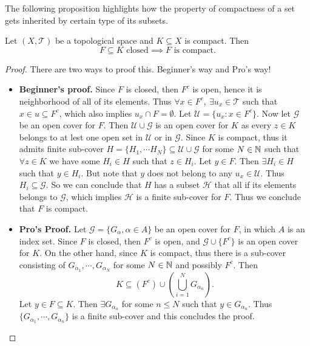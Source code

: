 The following proposition highlights how the property of compactness of a set gets inherited by certain type of its subsets. 

\begin{proposition}
	\label{prop:CloseSubSetOfCompactIsCompact}
	Let $(X,\mathcal{T})$ be a topological space and $K \subseteq X$ is compact. Then
	\[ F \subseteq K \text{ closed} \implies F \text{ is compact}. \]
\end{proposition}

\begin{proof}
	There are two ways to proof this. Beginner's way and Pro's way!
	\begin{itemize}
		\item \textbf{Beginner's proof.} Since $F$ is closed, then $F^c$ is open, hence it is neighborhood of all of its elements. Thus $\forall x \in F^c,\ \exists u_x \in \mathcal{T}$ such that $x \in u \subseteq F^c$, which also implies $u_x \cap F = \emptyset$. Let $\mathcal{U} = \{u_x: x\in F^c\}$. Now let $\mathcal{G}$ be an open cover for $F$. Then $\mathcal{U} \cup \mathcal{G}$ is an open cover for $K$ as every $z \in K$ belongs to at lest one open set in $\mathcal{U}$ or in $\mathcal{G}$. Since $K$ is compact, thus it admits finite sub-cover $H = \{H_1, \cdots H_N\} \subseteq \mathcal{U} \cup \mathcal{G}$ for some $N \in \mathbb{N}$ such that $\forall z \in K$ we have some $H_i \in H$ such that $z \in H_i$. Let $y \in F$. Then $\exists H_i \in H$ such that $y \in H_i$. But note that $y$ does not belong to any $u_x \in \mathcal{U}$. Thus $H_i \subseteq \mathcal{G}$. So we can conclude that $H$ has a subset $\mathcal{H}$ that all if its elements belongs to $\mathcal{G}$, which implies $\mathcal{H}$ is a finite sub-cover for $F$. Thus we conclude that $F$ is compact.
		\item \textbf{Pro's Proof.} Let $\mathcal{G} = \{ G_\alpha, \alpha \in A \}$ be an open cover for $F$, in which $A$ is an index set. Since $F$ is closed, then $F^c$ is open, and $\mathcal{G} \cup \{F^c\}$ is an open cover for $K$. On the other hand, since $K$ is compact, thus there is a sub-cover consisting of $G_{\alpha_1},\cdots,G_{\alpha_N}$ for some $N\in\mathbb{N}$ and possibly $F^c$. Then 
		\[ K \subseteq (F^c) \cup (\bigcup_{i=1}^{N} G_{\alpha_n}). \]
		Let $y \in F\subseteq K$. Then $\exists G_{\alpha_n}$ for some $n\leq N$ such that $y \in G_{\alpha_n}$. Thus $\{ G_{\alpha_1},\cdots,G_{\alpha_n} \}$ is a finite sub-cover and this concludes the proof.
	\end{itemize}
\end{proof}

